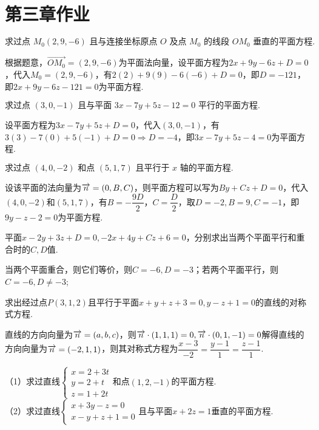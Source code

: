 \chapter{第三章作业}
\begin{example}{16}{}
    $\text{求过点 }M_0(2,9,-6)\text{ 且与连接坐标原点 }O\text{ 及点 }M_0\text{ 的线段 }OM_0\text{ 垂直的平面方程}.$
\end{example}
\begin{solution}
    根据题意，$\overrightarrow{OM_0}=(2,9,-6)$为平面法向量，设平面方程为$2x+9y-6z+D=0$，代入$M_0=(2,9,-6)$，有$2(2)+9(9)-6(-6)+D=0$，即$D=-121$，即$2x+9y-6z-121=0$为平面方程.
\end{solution}
\begin{example}{18}{}
    $\text{求过点 }(3,0,-1)\text{ 且与平面 }3x-7y+5z-12=0\text{ 平行的平面方程}.$
\end{example}
\begin{solution}
    设平面方程为$3x-7y+5z+D=0$，代入$(3,0,-1)$，有$3(3)-7(0)+5(-1)+D=0\Rightarrow D=-4$，即$3x-7y+5z-4=0$为平面方程.
\end{solution}
\begin{example}{20}{}
    $\text{求过点 }(4,0,-2)\text{ 和点 }(5,1,7)\text{ 且平行于 }x\text{ 轴的平面方程}.$
\end{example}
\begin{solution}
    设该平面的法向量为$\overrightarrow{n}=(0,B,C)$，则平面方程可以写为$By+Cz+D=0$，代入$(4,0,-2)$和$(5,1,7)$，有$B=-\dfrac{9D}2$，$C=\dfrac{D}2$，取$D=-2,B=9,C=-1$，即$9y-z-2=0$为平面方程.
\end{solution}
\begin{example}{22}{}
    平面$x-2y+3z+D=0,-2x+4y+Cz+6=0$，分别求出当两个平面平行和重合时的$C,D$值.
\end{example}
\begin{solution}
    当两个平面重合，则它们等价，则$C=-6,D=-3$；若两个平面平行，则$C=-6,D\neq -3$;
\end{solution}
\begin{example}{25}{}
    求出经过点$P(3,1,2)$且平行于平面$x+y+z+3=0,y-z+1=0$的直线的对称式方程.
\end{example}
\begin{solution}
    直线的方向向量为$\overrightarrow{n}=(a,b,c)$，则$\overrightarrow{n}\cdot(1,1,1)=0,\overrightarrow{n}\cdot(0,1,-1)=0$解得直线的方向向量为$\overrightarrow{n}=(-2,1,1)$，则其对称式方程为$\dfrac{x-3}{-2}=\dfrac{y-1}{1}=\dfrac{z-1}{1}$.
\end{solution}
\begin{example}{27}{}
    （1）求过直线$\begin{cases}x=2+3t\\y=2+t\\z=1+2t\end{cases}$和点$(1,2,-1)$的平面方程.\\（2）求过直线$\begin{cases}x+3y-z=0\\x-y+z+1=0\end{cases}$且与平面$x+2z=1$垂直的平面方程.
\end{example}

